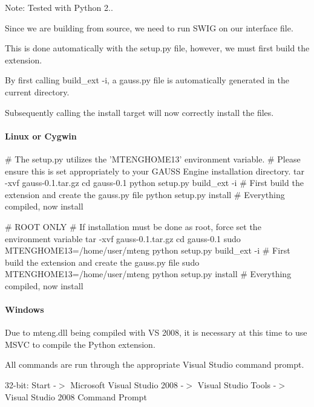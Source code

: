 Note\-: Tested with Python 2..

Since we are building from source, we need to run S\-W\-I\-G on our interface file.

This is done automatically with the {\ttfamily setup.\-py} file, however, we must first build the extension.

By first calling {\ttfamily build\-\_\-ext -\/i}, a {\ttfamily gauss.\-py} file is automatically generated in the current directory.

Subsequently calling the {\ttfamily install} target will now correctly install the files.

\paragraph*{Linux or Cygwin}


\begin{DoxyCode}
\textcolor{preprocessor}{# The setup.py utilizes the 'MTENGHOME13' environment variable.}
\textcolor{preprocessor}{}\textcolor{preprocessor}{# Please ensure this is set appropriately to your GAUSS Engine installation directory.}
\textcolor{preprocessor}{}tar -xvf gauss-0.1.tar.gz
cd gauss-0.1
python setup.py build\_ext -i      # First build the extension and create the gauss.py file
python setup.py install           # Everything compiled, now install

\textcolor{preprocessor}{# ROOT ONLY}
\textcolor{preprocessor}{}\textcolor{preprocessor}{# If installation must be done as root, force set the environment variable}
\textcolor{preprocessor}{}tar -xvf gauss-0.1.tar.gz
cd gauss-0.1
sudo MTENGHOME13=/home/user/mteng python setup.py build\_ext -i      # First build the extension and create 
      the gauss.py file
sudo MTENGHOME13=/home/user/mteng python setup.py install           # Everything compiled, now install
\end{DoxyCode}


\paragraph*{Windows}

Due to {\ttfamily mteng.\-dll} being compiled with V\-S 2008, it is necessary at this time to use M\-S\-V\-C to compile the Python extension.

All commands are run through the appropriate Visual Studio command prompt.

32-\/bit\-: {\ttfamily Start -\/$>$ Microsoft Visual Studio 2008 -\/$>$ Visual Studio Tools -\/$>$ Visual Studio 2008 Command Prompt}

